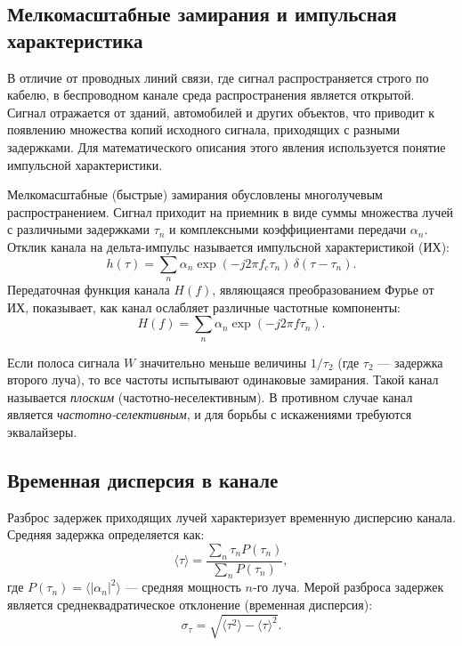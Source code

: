 \subsection{Мелкомасштабные замирания и импульсная характеристика}

В отличие от проводных линий связи, где сигнал распространяется строго по кабелю, в беспроводном канале среда распространения является открытой. Сигнал отражается от зданий, автомобилей и других объектов, что приводит к появлению множества копий исходного сигнала, приходящих с разными задержками. Для математического описания этого явления используется понятие импульсной характеристики.

Мелкомасштабные (быстрые) замирания обусловлены многолучевым распространением. Сигнал приходит на приемник в виде суммы множества лучей с различными задержками $\tau_n$ и комплексными коэффициентами передачи $\alpha_n$. Отклик канала на дельта-импульс называется импульсной характеристикой (ИХ):
\begin{equation}
    h(\tau) = \sum_n \alpha_n \exp(-j 2\pi f_c \tau_n)\, \delta(\tau - \tau_n).
\end{equation}
Передаточная функция канала $H(f)$, являющаяся преобразованием Фурье от ИХ, показывает, как канал ослабляет различные частотные компоненты:
\begin{equation}
    H(f) = \sum_n \alpha_n \exp(-j 2\pi f \tau_n).
\end{equation}

Если полоса сигнала $W$ значительно меньше величины $1/\tau_2$ (где $\tau_2$ --- задержка второго луча), то все частоты испытывают одинаковые замирания. Такой канал называется \textit{плоским} (частотно-неселективным). В противном случае канал является \textit{частотно-селективным}, и для борьбы с искажениями требуются эквалайзеры.

\subsection{Временная дисперсия в канале}

Разброс задержек приходящих лучей характеризует временную дисперсию канала. Средняя задержка определяется как:
\begin{equation}
    \langle \tau \rangle = \frac{\sum_n \tau_n P(\tau_n)}{\sum_n P(\tau_n)},
\end{equation}
где $P(\tau_n) = \langle |\alpha_n|^2 \rangle$ --- средняя мощность $n$-го луча. Мерой разброса задержек является среднеквадратическое отклонение (временная дисперсия):
\begin{equation}
    \sigma_\tau = \sqrt{\langle \tau^2 \rangle - \langle \tau \rangle^2}.
\end{equation}


